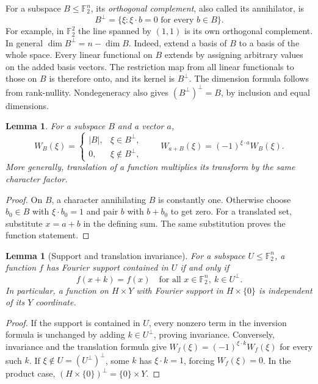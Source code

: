 \documentclass[11pt]{article}
\numberwithin{equation}{section}
\newtheorem{lemma}[theorem]{Lemma}
\theoremstyle{definition}
\theoremstyle{remark}\newtheorem{remark}[theorem]{Remark}
\newcommand{\F}{\mathbb F_2}
\begin{document}
For a subspace $B\le\F^n$, its \emph{orthogonal complement}, also called its annihilator, is
\[
 B^\perp=\{\xi:\xi\cdot b=0\text{ for every }b\in B\}.
\]
For example, in $\F^2$ the line spanned by $(1,1)$ is its own orthogonal complement. In general $\dim B^\perp=n-\dim B$. Indeed, extend a basis of $B$ to a basis of the whole space. Every linear functional on $B$ extends by assigning arbitrary values on the added basis vectors. The restriction map from all linear functionals to those on $B$ is therefore onto, and its kernel is $B^\perp$. The dimension formula follows from rank-nullity. Nondegeneracy also gives $(B^\perp)^\perp=B$, by inclusion and equal dimensions.

\begin{lemma}\label{lem:subtransform}
For a subspace $B$ and a vector $a$,
\[
 W_B(\xi)=\begin{cases}|B|,&\xi\in B^\perp,\\0,&\xi\notin B^\perp,\end{cases}
 \qquad W_{a+B}(\xi)=(-1)^{\xi\cdot a}W_B(\xi).
\]
More generally, translation of a function multiplies its transform by the same character factor.
\end{lemma}
\begin{proof}
On $B$, a character annihilating $B$ is constantly one. Otherwise choose $b_0\in B$ with $\xi\cdot b_0=1$ and pair $b$ with $b+b_0$ to get zero. For a translated set, substitute $x=a+b$ in the defining sum. The same substitution proves the function statement.
\end{proof}

\begin{lemma}[Support and translation invariance]\label{lem:period}
For a subspace $U\le\F^n$, a function $f$ has Fourier support contained in $U$ if and only if
\[
 f(x+k)=f(x)\quad\text{for all }x\in\F^n,\ k\in U^\perp.
\]
In particular, a function on $H\times Y$ with Fourier support in $H\times\{0\}$ is independent of its $Y$ coordinate.
\end{lemma}
\begin{proof}
If the support is contained in $U$, every nonzero term in the inversion formula is unchanged by adding $k\in U^\perp$, proving invariance. Conversely, invariance and the translation formula give $W_f(\xi)=(-1)^{\xi\cdot k}W_f(\xi)$ for every such $k$. If $\xi\notin U=(U^\perp)^\perp$, some $k$ has $\xi\cdot k=1$, forcing $W_f(\xi)=0$. In the product case, $(H\times\{0\})^\perp=\{0\}\times Y$.
\end{proof}
\end{document}
